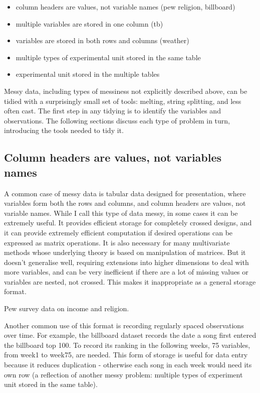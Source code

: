 \documentclass[oneside]{article}
\begin{document}
\begin{itemize}

\item column headers are values, not variable names (pew religion, billboard)
\item multiple variables are stored in one column (tb)
\item variables are stored in both rows and columns (weather)
\item multiple types of experimental unit stored in the same table
\item experimental unit stored in the multiple tables
\end{itemize}

Messy data, including types of messiness not explicitly described above, can be tidied with a surprisingly small set of tools: melting, string splitting, and less often cast. The first step in any tidying is to identify the variables and observations. The following sections discuss each type of problem in turn, introducing the tools needed to tidy it.

\subsection{Column headers are values, not variables names}

A common case of messy data is tabular data designed for presentation, where variables form both the rows and columns, and column headers are values, not variable names. While I call this type of data messy, in some cases it can be extremely useful. It provides efficient storage for completely crossed designs, and it can provide extremely efficient computation if desired operations can be expressed as matrix operations. It is also necessary for many multivariate methods whose underlying theory is based on manipulation of matrices. But it doesn't generalise well, requiring extensions into higher dimensions to deal with more variables, and can be very inefficient if there are a lot of missing values or variables are nested, not crossed. This makes it inappropriate as a general storage format.

\begin{table}[htbp]
  \centering
  
  \caption{Pew survey data on income and religion.}
  \label{tbl:pew-raw}
\end{table}

Another common use of this format is recording regularly spaced observations over time. For example, the billboard dataset records the date a song first entered the billboard top 100. To record its ranking in the following weeks, 75 variables, from week1 to week75, are needed. This form of storage is useful for data entry because it reduces duplication - otherwise each song in each week would need its own row (a reflection of another messy problem: multiple types of experiment unit stored in the same table).
\end{document}
